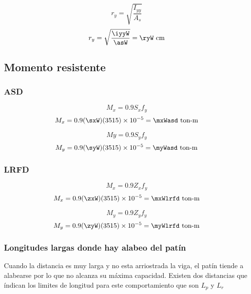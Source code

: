 \documentclass[11pt,a4paper]{article}
\begin{document}
\begin{equation}
	r_{y}=\sqrt{\frac{I_{yy}}{A_s}} 
\end{equation}
\begin{align*}
	r_{y}=\sqrt{\frac{\iyyW}{\asW}}=\ryW \text{ cm}
\end{align*}

\subsection{Momento resistente}
\subsubsection{ASD}
\begin{equation}
	M_{x}=0.9S_x f_y 
\end{equation}
\begin{align*}
	M_{x}=0.9 (\sxW) (\fy) \times10^{-5}=\mxWasd  \text{ ton-m}
\end{align*}

\begin{equation}
	M{y}=0.9S_y f_y 
\end{equation}
\begin{align*}
	M_{y}=0.9 (\syW) (\fy) \times10^{-5}=\myWasd  \text{ ton-m}
\end{align*}

\subsubsection{LRFD}
\begin{equation}
	M_{x}=0.9Z_x f_y 
\end{equation}
\begin{align*}
	M_{x}=0.9 (\zxW) (\fy) \times10^{-5}=\mxWlrfd  \text{ ton-m}
\end{align*}

\begin{equation}
	M_{y}=0.9Z_y f_y 
\end{equation}
\begin{align*}
	M_{y}=0.9 (\zyW) (\fy) \times10^{-5}=\myWlrfd  \text{ ton-m}
\end{align*}

\subsubsection{Longitudes largas donde hay alabeo del patín}
Cuando la distancia es muy larga y no esta arriostrada la viga, el patín tiende a alabearse por lo que no alcanza su máxima capacidad. Existen dos distancias que índican los limites de longitud para este comportamiento que son $L_p$ y $L_r$
\end{document}
